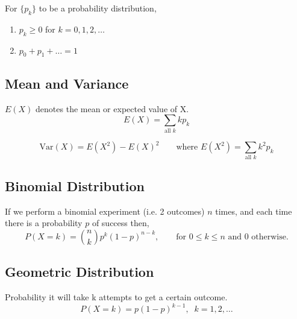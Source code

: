 \documentclass[a4paper,10pt]{article}
\begin{document}
For $\{p_k\}$ to be a probability distribution,
\begin{enumerate}
\renewcommand{\labelenumi}{\roman{enumi})}
\item $p_k \ge 0$ for $k = 0, 1, 2, \dots$
\item $p_0 + p_1 + \dots = 1$
\end{enumerate}

\subsection*{Mean and Variance}
$E(X)$ denotes the mean or expected value of X.\\
$$E(X) = \sum_{\mbox{all }k} kp_k$$

$$\mbox{Var}(X) = E(X^2) - E(X)^2 \qquad \mbox{where } E(X^2) = \sum_{\mbox{all } k} k^2 p_k$$

\subsection*{Binomial Distribution}
If we perform a binomial experiment (i.e. 2 outcomes) $n$ times, and each time there is a probability $p$ of success then,
$$P(X=k) = \binom{n}{k} p^k (1-p)^{n-k},\qquad \mbox{for } 0\le k \le n \mbox{ and 0 otherwise}.$$

\subsection*{Geometric Distribution}
Probability it will take k attempts to get a certain outcome.
$$P(X=k) = p(1-p)^{k-1}, \;\; k = 1, 2, \dots$$
\end{document}
